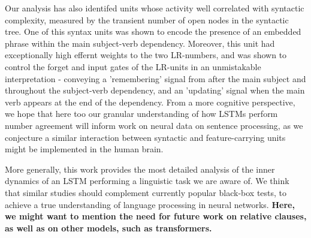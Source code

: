 Our analysis has also identifed units whose activity well correlated with syntactic complexity, measured by the transient number of open nodes in the syntactic tree. One of this syntax units was shown to encode the presence of an embedded phrase within the main subject-verb dependency. Moreover, this unit had exceptionally high effernt weights to the two LR-numbers, and was shown to control the forget and input gates of the LR-units in an unmistakable interpretation - conveying a 'remembering' signal from after the main subject and throughout the subject-verb dependency, and an 'updating' signal when the main verb appears at the end of the dependency. From a more cognitive perspective, we hope that here too our granular understanding of how LSTMs perform number agreement will inform work on neural data on sentence processing, as we conjecture a similar interaction between syntactic and feature-carrying units might be implemented in the human brain.


More generally, this work provides the most detailed analysis of the inner dynamics of an LSTM performing a linguistic task we are aware of. We think that similar studies should complement currently popular black-box tests, to achieve a true understanding of language processing in neural networks. \textbf{Here, we might want to mention the need for future work on relative clauses, as well as on other  models, such as transformers.}


